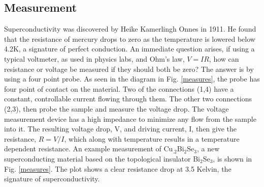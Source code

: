 \subsection{Measurement}
Superconductivity was discovered by Heike Kamerlingh Onnes in 1911.
He found that the resistance of mercury drops to zero as the temperature is lowered below 4.2K, a signature of perfect conduction. An immediate question arises, if using a typical voltmeter, as used in physics labs, and Ohm's law, $V=IR$, how can resistance or voltage be measured if they should both be zero? The answer is by using a four point probe. As seen in the diagram in Fig. \ref{measures}, the probe has four point of contact on the material. Two of the connections (1,4) have a constant, controllable current flowing through them. The other two connections (2,3), then probe the sample and measure the voltage drop. The voltage measurement device has a high impedance to minimize any flow from the sample into it. The resulting voltage drop, V, and driving current, I, then give the resistance, $R=V/I$, which along with temperature results in a temperature dependent resistance. An example measurement of Cu$_{.2}$Bi$_2$Se$_3$, a new superconducting material based on the topological insulator Bi$_2$Se$_3$, is shown in Fig. \ref{measures}. The plot shows a clear resistance drop at 3.5 Kelvin, the signature of superconductivity. 
